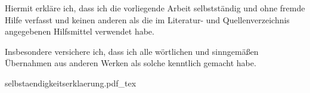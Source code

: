 Hiermit erkläre ich, dass ich die vorliegende Arbeit selbstständig und ohne fremde Hilfe verfasst und keinen anderen als die im Literatur- und Quellenverzeichnis angegebenen Hilfsmittel verwendet habe.\kleinerabstand

\noindent Insbesondere versichere ich, dass ich alle wörtlichen und sinngemäßen Übernahmen aus anderen Werken als solche kenntlich gemacht habe.\kleinerabstand

\begin{center}
	\def\svgwidth{\textwidth}
	{selbstaendigkeitserklaerung.pdf_tex}
\end{center}
